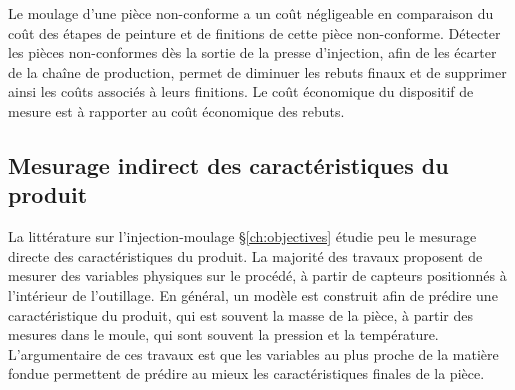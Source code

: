 Le moulage d'une pièce non-conforme a un coût négligeable en comparaison du coût des étapes de peinture et de finitions de cette pièce non-conforme.
Détecter les pièces non-conformes dès la sortie de la presse d’injection, afin de les écarter de la chaîne de production, permet de diminuer les rebuts finaux et de supprimer ainsi les coûts associés à leurs finitions.
Le coût économique du dispositif de mesure est à rapporter au coût économique des rebuts.

\subsection{Mesurage indirect des caractéristiques du produit} \label{subsec:indirect_measures}
La littérature sur l'injection-moulage §\ref{ch:objectives} étudie peu le mesurage directe des caractéristiques du produit.
La majorité des travaux proposent de mesurer des variables physiques sur le procédé, à partir de capteurs positionnés à l'intérieur de l'outillage.
En général, un modèle est construit afin de prédire une caractéristique du produit, qui est souvent la masse de la pièce, à partir des mesures dans le moule, qui sont souvent la pression et la température.
L'argumentaire de ces travaux est que les variables au plus proche de la matière fondue permettent de prédire au mieux les caractéristiques finales de la pièce.



